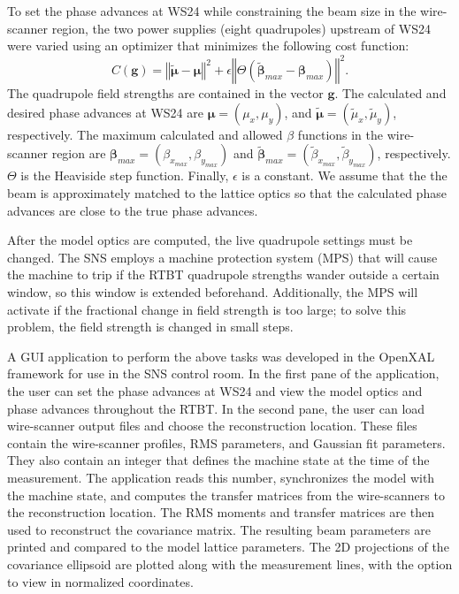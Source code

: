 To set the phase advances at WS24 while constraining the beam size in the wire-scanner region, the two power supplies (eight quadrupoles) upstream of WS24 were varied using an optimizer that minimizes the following cost function:
%
\begin{equation}
    C(\mathbf{g}) = \left\Vert{\tilde{\bm{\mu}} - \bm{\mu} }\right\Vert^2
    + 
    \epsilon
    \left\Vert
    \Theta\left(
        \tilde{\bm{\beta}}_{max} - \bm{\beta}_{max}
    \right)
    \right\Vert^2
    .
\end{equation}
%
The quadrupole field strengths are contained in the vector $\mathbf{g}$. The calculated and desired phase advances at WS24 are $\bm{\mu} = (\mu_x, \mu_y)$, and $\tilde{\bm{\mu}} = (\tilde{\mu}_x, \tilde{\mu}_y)$, respectively. The maximum calculated and allowed $\beta$ functions in the wire-scanner region are $\bm{\beta}_{max} = (\beta_{x_{max}}, \beta_{y_{max}})$ and $\tilde{\bm{\beta}}_{max} = (\tilde{\beta}_{x_{max}}, \tilde{\beta}_{y_{max}})$, respectively. $\Theta$ is the Heaviside step function. Finally, $\epsilon$ is a constant. We assume that the the beam is approximately matched to the lattice optics so that the calculated phase advances are close to the true phase advances.

After the model optics are computed, the live quadrupole settings must be changed. The SNS employs a machine protection system (MPS) that will cause the machine to trip if the RTBT quadrupole strengths wander outside a certain window, so this window is extended beforehand. Additionally, the MPS will activate if the fractional change in field strength is too large; to solve this problem, the field strength is changed in small steps. 

A GUI application to perform the above tasks was developed in the OpenXAL framework for use in the SNS control room. In the first pane of the application, the user can set the phase advances at WS24 and view the model optics and phase advances throughout the RTBT. In the second pane, the user can load wire-scanner output files and choose the reconstruction location. These files contain the wire-scanner profiles, RMS parameters, and Gaussian fit parameters. They also contain an integer that defines the machine state at the time of the measurement. The application reads this number, synchronizes the model with the machine state, and computes the transfer matrices from the wire-scanners to the reconstruction location. The RMS moments and transfer matrices are then used to reconstruct the covariance matrix. The resulting beam parameters are printed and compared to the model lattice parameters. The 2D projections of the covariance ellipsoid are plotted along with the measurement lines, with the option to view in normalized coordinates. 



